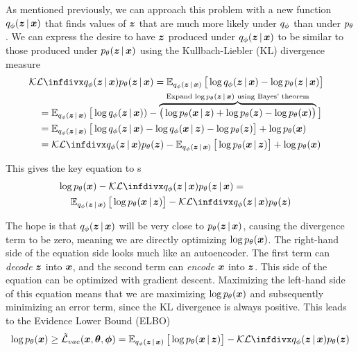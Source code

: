 As mentioned previously, we can approach this problem with a new function $\qphi \given{\vz}{\vx}$ that finds values of $\boldsymbol{z}$ that are much more likely under $q_{\phi}$ than under $p_{\theta}$. We can express the desire to have $\boldsymbol{z}$ produced under $\qphi \given{\vz}{\vx}$ to be similar to those produced under $\ptheta \given{\vz}{\vx}$ using the Kullbach-Liebler (KL) divergence measure
\begin{align}
\label{kl-eq}
\lefteqn{\KL{\qphi \given{\vz}{\vx}}{\ptheta \given{\vz}{\vx}} =
\E_{\qphi \given{\vz}{\vx} } \big [\log{\qphi \given{\vz}{\vx}} - \log{\ptheta \given{\vz}{\vx}} \big ] \nonumber}\\
& & & = \E_{\qphi \given{\vz}{\vx} }\big {[} \log{\qphi \given{\vz}{\vx})} - \overbrace{ \big{(} \log{\ptheta \given{\vx}{\vz}} + \log{\ptheta(\vz)} - \log{\ptheta(\vx)} \big{)} }^{\text{Expand $\log \ptheta \given{\vz}{\vx}$ using Bayes' theorem}} \big ] \nonumber\\
& & & = \E_{\qphi \given{\vz}{\vx} } \big{[} \log{\qphi \given{\vz}{\vx}} - \log{\qphi \given{\vx}{\vz}} - \log{\ptheta(\vz)} \big{]} + \log{\ptheta(\vx)} \nonumber \\
& & & = \KL{\qphi\given{\vz}{\vx}}{\ptheta(\vz)} - \E_{\qphi\given{\vz}{\vx} } \big{[} \log{\ptheta \given{\vx}{\vz}} \big{]} + \log{\ptheta(\vx)}
\end{align}

This gives the key equation to \vae{}s
\begin{align}\label{eq:vae}
\nonumber \lefteqn{\log{\ptheta(\vx)} - \KL{\qphi \given{\vz}{\vx}}{\ptheta \given{\vz}{\vx}} =}\\
& & & \E_{\qphi \given{\vz}{\vx}} \big{[} \log{\ptheta \given{\vx}{\vz}} \big{]} - \KL{\qphi \given{\vz}{\vx}}{\ptheta(\vz)}
\end{align}

The hope is that $\qphi \given{\vz}{\vx}$ will be very close to $\ptheta \given{\vz}{\vx}$, causing the divergence term to be zero, meaning we are directly optimizing $\log p_{\theta}(\boldsymbol{x})$. The right-hand side of the equation side looks much like an autoencoder. The first term can \emph{decode} $\boldsymbol{z}$ into $\boldsymbol{x}$, and the second term can \emph{encode} $\boldsymbol{x}$ into $\boldsymbol{z}$. This side of the equation can be optimized with gradient descent. Maximizing the left-hand side of this equation means that we are maximizing $\log{p_{\theta}(\boldsymbol{x})}$ and subsequently minimizing an error term, since the KL divergence is always positive. This leads to the Evidence Lower Bound (ELBO)
\begin{equation} \label{eq:elbo}
    \log \ptheta(\vx) \geq \tilde{\mathcal{L}}_{vae}(\vx, \vth, \vph) = \E_{\qphi \given{\vz}{\vx} } \big{[} \log{\ptheta \given{\vx}{\vz}} \big{]} - \KL{\qphi \given{\vz}{\vx}}{\ptheta(\vz)}
\end{equation}

